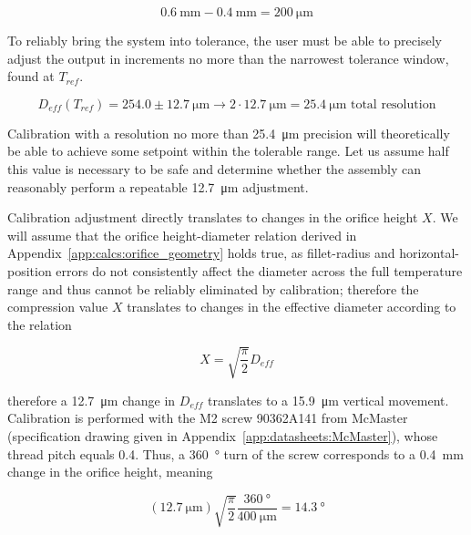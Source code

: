 \documentclass[12pt, letterpaper]{report}%
\begin{document}
\begin{appendices}
			\begin{equation}
				\SI{0.6}{\milli\meter} - \SI{0.4}{\milli\meter} = \SI{200}{\micro\meter}
			\end{equation}

			To reliably bring the system into tolerance, the user must be able to precisely adjust the output in increments no more than the narrowest tolerance window, found at $T_{ref}$.

			\begin{equation}
				D_{eff}(T_{ref}) = 254.0 \pm \SI{12.7}{\micro\meter} \rightarrow 2 \cdot \SI{12.7}{\micro\meter} = \SI{25.4}{\micro\meter} \text{ total resolution}
			\end{equation}

			Calibration with a resolution no more than \SI{25.4}{\micro\meter} precision will theoretically be able to achieve some setpoint within the tolerable range.
			Let us assume half this value is necessary to be safe and determine whether the assembly can reasonably perform a repeatable \SI{12.7}{\micro\meter} adjustment.

			Calibration adjustment directly translates to changes in the orifice height $X$. We will assume that the orifice height-diameter relation derived in Appendix~\ref{app:calcs:orifice_geometry} holds true,
			as fillet-radius and horizontal-position errors do not consistently affect the diameter across the full temperature range and thus cannot be reliably eliminated by calibration;
			therefore the compression value $X$ translates to changes in the effective diameter according to the relation

			\begin{equation}
				X = \sqrt{\frac{\pi}{2}} D_{eff}
			\end{equation}

			therefore a \SI{12.7}{\micro\meter} change in $D_{eff}$ translates to a \SI{15.9}{\micro\meter} vertical movement.
			Calibration is performed with the M2 screw 90362A141 from McMaster (specification drawing given in Appendix~\ref{app:datasheets:McMaster}),
			whose thread pitch equals \SI{0.4}{}. Thus, a \SI{360}{\degree} turn of the screw corresponds to a \SI{0.4}{\milli\meter} change in the orifice height, meaning

			\begin{equation}
				\left( \SI{12.7}{\micro\meter} \right) \sqrt{\frac{\pi}{2}} \frac{\SI{360}{\degree}}{\SI{400}{\micro\meter}} = \SI{14.3}{\degree}
			\end{equation}


\end{appendices}
\end{document}
